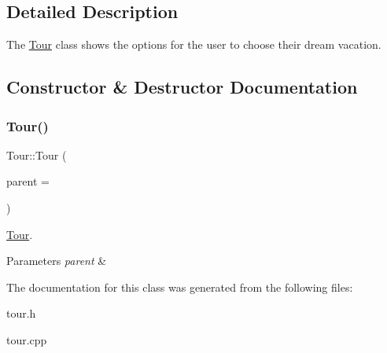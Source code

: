 \subsection{Detailed Description}
The \hyperlink{class_tour}{Tour} class shows the options for the user to choose their dream vacation. 

\subsection{Constructor \& Destructor Documentation}
\mbox{\label{class_tour_af2f0737a5f0fac6b6bd564a999525ee1}} 
\subsubsection{\texorpdfstring{Tour()}{Tour()}}
{\footnotesize\ttfamily Tour\+::\+Tour (\begin{DoxyParamCaption}\item[{Q\+Widget $\ast$}]{parent = {} }\end{DoxyParamCaption})\hspace{0.3cm}{\ttfamily [explicit]}}



\hyperlink{class_tour}{Tour}. 


\begin{DoxyParams}{Parameters}
{\em parent} & \\
\hline
\end{DoxyParams}


The documentation for this class was generated from the following files\+:\begin{DoxyCompactItemize}
\item 
tour.\+h\item 
tour.\+cpp\end{DoxyCompactItemize}
